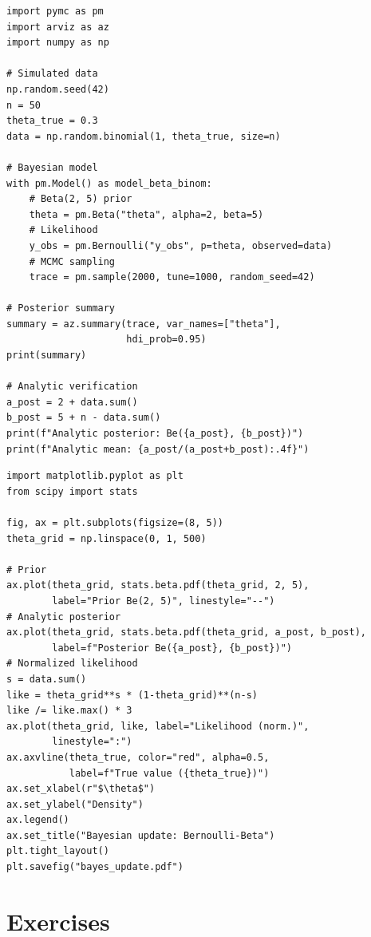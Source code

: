 \begin{codeblock}[title=\textbf{Bernoulli--Beta model with PyMC}]
\begin{verbatim}
import pymc as pm
import arviz as az
import numpy as np

# Simulated data
np.random.seed(42)
n = 50
theta_true = 0.3
data = np.random.binomial(1, theta_true, size=n)

# Bayesian model
with pm.Model() as model_beta_binom:
    # Beta(2, 5) prior
    theta = pm.Beta("theta", alpha=2, beta=5)
    # Likelihood
    y_obs = pm.Bernoulli("y_obs", p=theta, observed=data)
    # MCMC sampling
    trace = pm.sample(2000, tune=1000, random_seed=42)

# Posterior summary
summary = az.summary(trace, var_names=["theta"],
                     hdi_prob=0.95)
print(summary)

# Analytic verification
a_post = 2 + data.sum()
b_post = 5 + n - data.sum()
print(f"Analytic posterior: Be({a_post}, {b_post})")
print(f"Analytic mean: {a_post/(a_post+b_post):.4f}")
\end{verbatim}
\end{codeblock}

\begin{codeblock}[title=\textbf{Visualizing prior--posterior update}]
\begin{verbatim}
import matplotlib.pyplot as plt
from scipy import stats

fig, ax = plt.subplots(figsize=(8, 5))
theta_grid = np.linspace(0, 1, 500)

# Prior
ax.plot(theta_grid, stats.beta.pdf(theta_grid, 2, 5),
        label="Prior Be(2, 5)", linestyle="--")
# Analytic posterior
ax.plot(theta_grid, stats.beta.pdf(theta_grid, a_post, b_post),
        label=f"Posterior Be({a_post}, {b_post})")
# Normalized likelihood
s = data.sum()
like = theta_grid**s * (1-theta_grid)**(n-s)
like /= like.max() * 3
ax.plot(theta_grid, like, label="Likelihood (norm.)",
        linestyle=":")
ax.axvline(theta_true, color="red", alpha=0.5,
           label=f"True value ({theta_true})")
ax.set_xlabel(r"$\theta$")
ax.set_ylabel("Density")
ax.legend()
ax.set_title("Bayesian update: Bernoulli-Beta")
plt.tight_layout()
plt.savefig("bayes_update.pdf")
\end{verbatim}
\end{codeblock}

\section{Exercises}


